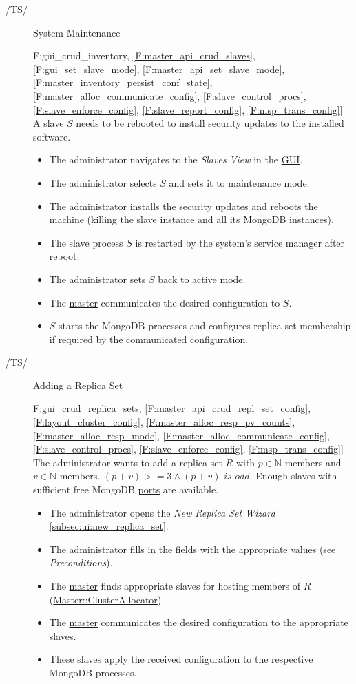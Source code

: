 \documentclass[a4paper, 11pt]{article}
\makeatletter
\def\namedlabel#1#2{\begingroup
    #2%
    \def\@currentlabel{#2}%
    \phantomsection\label{#1}\endgroup
}
\newcommand{\oitem}[2]{
  \@ifundefined{c@oitem#1}{\newcounter{oitem#1}}{} %
  \addtocounter{oitem#1}{10}
  \item[\namedlabel{#1:#2}{/#1\arabic{oitem#1}/}]
}
\newcommand{\testsequence}[3][]{
	\begin{description}[leftmargin=!,labelwidth=\widthof{\bfseries Preconditions}]
		\ifthenelse{\equal{#1}{}}
		{} %
		{\item[Tests] #1}
		\item[Preconditions] #2
		\item[Steps] #3
	\end{description}
}
\makeatother
\begin{document}
\begin{description}
\oitem{TS}{} System Maintenance
\testsequence
[\ref{F:gui_crud_inventory}, \ref{F:master_api_crud_slaves}, \ref{F:gui_set_slave_mode}, \ref{F:master_api_set_slave_mode}, \ref{F:master_inventory_persist_conf_state}, \ref{F:master_alloc_communicate_config}, \ref{F:slave_control_procs}, \ref{F:slave_enforce_config}, \ref{F:slave_report_config}, \ref{F:msp_trans_config}]
{
	A \gls{slave} $S$ needs to be rebooted to install security updates to the installed software.
}
{
	\begin{itemize}
		\item The \gls{administrator} navigates to the \textit{Slaves View} in the \hyperref[SM:GUI]{GUI}.
		\item The \gls{administrator} selects $S$ and sets it to \gls{maintenance mode}.
		\item The \gls{administrator} installs the security updates and reboots the machine (killing the \gls{slave} instance and all its \gls{MongoDB} instances).
		\item The \gls{slave} process $S$ is restarted by the system's service manager after reboot.
		\item The \gls{administrator} sets $S$ back to \gls{active mode}.
		\item The \hyperref[SM:Master]{master} communicates the desired configuration to $S$.
		\item $S$ starts the \gls{MongoDB} processes and configures \gls{replica set} membership if required by the communicated configuration.
	\end{itemize}
}


\oitem{TS}{} Adding a Replica Set
\testsequence
[\ref{F:gui_crud_replica_sets}, \ref{F:master_api_crud_repl_set_config}, \ref{F:layout_cluster_config}, \ref{F:master_alloc_resp_pv_counts}, \ref{F:master_alloc_resp_mode}, \ref{F:master_alloc_communicate_config}, \ref{F:slave_control_procs}, \ref{F:slave_enforce_config}, \ref{F:msp_trans_config}]
{
	The \gls{administrator} wants to add a \gls{replica set} $R$ with $p \in \mathbb{N}$  members and $v \in \mathbb{N}$  members. $(p+v) >= 3 \land (p+v) \textit{ is odd}$. Enough \glspl{slave} with sufficient free \gls{MongoDB} \hyperref[D:slave_mongod_portrange]{ports} are available.
}
{
	\begin{itemize}
		\item The \gls{administrator} opens the \textit{New Replica Set Wizard} \ref{subsec:ui:new_replica_set}.
		\item The \gls{administrator} fills in the fields with the appropriate values (see \textit{Preconditions}).
		\item The \hyperref[SM:Master]{master} finds appropriate \glspl{slave} for hosting members of $R$ (\hyperref[SM:master_clusterallocator]{Master::ClusterAllocator}).
		\item The \hyperref[SM:Master]{master} communicates the desired configuration to the appropriate \glspl{slave}.
		\item These \glspl{slave} apply the received configuration to the respective MongoDB processes.
	\end{itemize}
}



\end{description}
\end{document}
